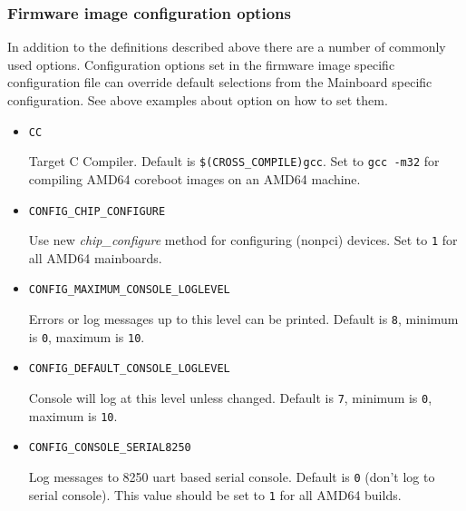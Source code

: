 \documentclass[titlepage,12pt]{article}
\begin{document}
\subsubsection{Firmware image configuration options}
In addition to the definitions described above there are a number of
commonly used options. Configuration options set in the firmware image
specific configuration file can override default selections from the
Mainboard specific configuration.  See above examples about
option on how to set them.

\begin{itemize}

\item \begin{verbatim}CC\end{verbatim}

Target C Compiler. Default is \texttt{\$(CROSS\_COMPILE)gcc}. Set to
\texttt{gcc -m32} for compiling AMD64 coreboot images on an AMD64 
machine.

\item \begin{verbatim}CONFIG_CHIP_CONFIGURE \end{verbatim}

Use new \textit{chip\_configure} method for configuring (nonpci)
devices. Set to \texttt{1} for all AMD64 mainboards.

\item \begin{verbatim}CONFIG_MAXIMUM_CONSOLE_LOGLEVEL\end{verbatim}

Errors or log messages up to this level can be printed. Default is
\texttt{8}, minimum is \texttt{0}, maximum is \texttt{10}.

\item \begin{verbatim}CONFIG_DEFAULT_CONSOLE_LOGLEVEL\end{verbatim}

Console will log at this level unless changed. Default is \texttt{7}, 
minimum is \texttt{0}, maximum is \texttt{10}.

\item \begin{verbatim}CONFIG_CONSOLE_SERIAL8250\end{verbatim}

Log messages to 8250 uart based serial console. Default is \texttt{0}
(don't log to serial console). This value should be set to \texttt{1}
for all AMD64 builds.


\end{itemize}
\end{document}
